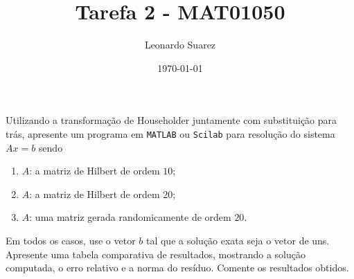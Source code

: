 \documentclass{article}
\title{Tarefa 2 - MAT01050}
\author{Leonardo Suarez}
\date{\today}
\begin{document}
\maketitle

\begin{prblm}
    Utilizando a transformação de Householder juntamente com substituição para trás, apresente um programa em \texttt{MATLAB} ou \texttt{Scilab} para resolução do sistema \(Ax=b\) sendo
    \begin{enumerate}
        \item [(a)] \(A\): a matriz de Hilbert de ordem \(10\);
        \item [(b)] \(A\): a matriz de Hilbert de ordem \(20\);
        \item [(c)] \(A\): uma matriz gerada randomicamente de ordem \(20\).
    \end{enumerate}
    Em todos os casos, use o vetor \(b\) tal que a solução exata seja o vetor de uns. Apresente uma tabela comparativa de resultados, mostrando a solução computada, o erro relativo e a norma do resíduo. Comente os resultados obtidos.
\end{prblm}
\end{document}
